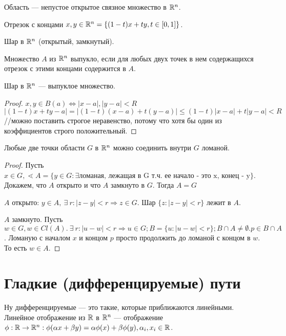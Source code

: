 \documentclass[12pt]{report}
\begin{document}
\begin{defn}
Область --- непустое открытое связное множество в $\mathbb{R}^n$.
\end{defn}

\begin{defn}
Отрезок с концами $x, y \in \mathbb{R}^n = \{(1 - t)x + ty, t \in [0, 1]\}$.

Шар в $\mathbb{R}^n$ (открытый, замкнутый).

Множество $A$ из $\mathbb{R}^n$ выпукло, если для любых двух точек в нем содержащихся отрезок с этими концами содержится в $A$.
\end{defn}

\begin{st}
Шар в $\mathbb{R}^n$ --- выпуклое множество.
\end{st}
\begin{proof}
$x, y \in B(a) \Leftrightarrow |x - a|, |y - a| < R$
$$|(1 - t)x + ty  - a| = |(1 - t)(x - a) + t(y - a)| \le (1 - t)|x - a| + t|y - a| < R$$
//можно поставить строгое неравенство, потому что хотя бы один из коэффициентов строго положительный.
\end{proof}

\begin{thm}
Любые две точки области $G$ в $\mathbb{R}^n$ можно соединить внутри $G$ ломаной.
\end{thm}
\begin{proof}
Пусть $x \in G, \lessdot A = \{y \in G: \exists \mbox{ломаная, лежащая в G т.ч. ее начало - это x, конец - y}\}$. Докажем, что $A$ открыто и что $A$ замкнуто в $G$. Тогда $A = G$

$A$ открыто: $y \in A, ~\exists ~r: |z - y| < r \Rightarrow z \in G$. Шар $\{z: |z - y| < r\}$ лежит в $A$.

$A$ замкнуто. Пусть $w \in G, w \in Cl(A). ~\exists ~r : |u - w| < r \Rightarrow u \in G; B = \{u: |u - w| < r\}; B \cap A \neq \emptyset. p \in B \cap A$. Ломаную с началом $x$ и концом $p$ просто продолжить до ломаной с концом в $w$. То есть $w \in A$.
\end{proof}

\section{Гладкие (дифференцируемые) пути}

Ну дифференцируемые --- это такие, которые приближаются линейными. Линейное отображение из $\mathbb{R}$ в $\mathbb{R}^n$ --- отображение $\phi: \mathbb{R} \to \mathbb{R}^n: \phi(\alpha x + \beta y) = \alpha \phi(x) + \beta \phi(y), \alpha_i, x_i \in \mathbb{R}$.
\end{document}
